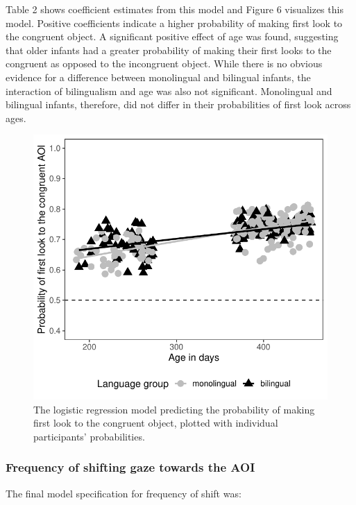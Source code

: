 \documentclass[,man,floatsintext]{apa6}
\begin{document}
\noindent Table 2 shows coefficient estimates from this model and Figure 6 visualizes this model. Positive coefficients indicate a higher probability of making first look to the congruent object. A significant positive effect of age was found, suggesting that older infants had a greater probability of making their first looks to the congruent as opposed to the incongruent object. While there is no obvious evidence for a difference between monolingual and bilingual infants, the interaction of bilingualism and age was also not significant. Monolingual and bilingual infants, therefore, did not differ in their probabilities of first look across ages.

\begin{figure}
\centering
\includegraphics{gaze-following-paper_files/figure-latex/fig6-1.pdf}
\caption{\label{fig:fig6}The logistic regression model predicting the probability of making first look to the congruent object, plotted with individual participants' probabilities.}
\end{figure}

\hypertarget{frequency-of-shifting-gaze-towards-the-aoi}{%
\subsubsection{Frequency of shifting gaze towards the AOI}\label{frequency-of-shifting-gaze-towards-the-aoi}}

The final model specification for frequency of shift was:
\end{document}
